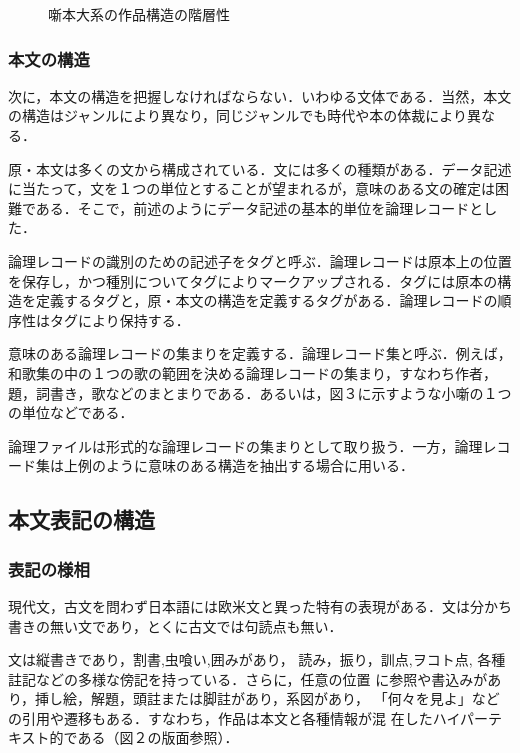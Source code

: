 \begin{figure}[htbp]
  \begin{center}
    \leavevmode
{}
\vspace*{5mm}

    \caption{噺本大系の作品構造の階層性}
    \label{fig:3}
  \end{center}
\end{figure}

\subsubsection{本文の構造}
\label{sec:3.1.2setu}

次に，本文の構造を把握しなければならない．いわゆる文体である．当然，本文
の構造はジャンルにより異なり，同じジャンルでも時代や本の体裁により異な
る．

原・本文は多くの文から構成されている．文には多くの種類がある．データ記述
に当たって，文を１つの単位とすることが望まれるが，意味のある文の確定は困
難である．そこで，前述のようにデータ記述の基本的単位を論理レコードとし
た．

論理レコードの識別のための記述子をタグと呼ぶ．論理レコードは原本上の位置
を保存し，かつ種別についてタグによりマークアップされる．タグには原本の構
造を定義するタグと，原・本文の構造を定義するタグがある．論理レコードの順
序性はタグにより保持する．

意味のある論理レコードの集まりを定義する．論理レコード集と呼ぶ．例えば，
和歌集の中の１つの歌の範囲を決める論理レコードの集まり，すなわち作者，
題，詞書き，歌などのまとまりである．あるいは，図３に示すような小噺の１つ
の単位などである．

論理ファイルは形式的な論理レコードの集まりとして取り扱う．一方，論理レコ
ード集は上例のように意味のある構造を抽出する場合に用いる．
\newpage

\subsection{本文表記の構造}
\label{sec:3.2setu}

\subsubsection{表記の様相}
\label{sec:3.2.1setu}

現代文，古文を問わず日本語には欧米文と異った特有の表現がある．文は分かち
書きの無い文であり，とくに古文では句読点も無い．

文は縦書きであり，割書\yougo ,虫喰い\yougo ,囲み\yougo があり，
読み，振り，訓点\yougo ,ヲコト点\yougo ,
各種註記などの多様な傍記を持っている．さらに，任意の位置
に参照や書込みがあり，挿し絵，解題，頭註または脚註があり，系図があり，
「何々を見よ」などの引用や遷移もある．すなわち，作品は本文と各種情報が混
在したハイパーテキスト的である（図２の版面参照）．


